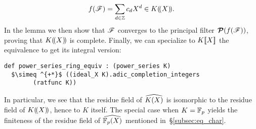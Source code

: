 \documentclass[sigplan,screen]{acmart}
\begin{document}
\[
f(\filter)=\sum_{d\in\ZZ} c_dX^d\in\laurentseries[K].
\]
In the lemma \href{https://github.com/mariainesdff/local_fields_journal/blob/0b408ff3af36e18f991f9d4cb87be3603cfc3fc3/src/laurent_series_equiv_adic_completion.lean#L630}{\extlink} we then show that $\filter$ converges to the principal filter $\princfilter(f(\filter))$, proving that $\laurentseries[K]$ is complete. Finally, we can specialize to $\powerseries[K]$ the equivalence 
to get its integral version:\href{https://github.com/mariainesdff/local_fields_journal/blob/0b408ff3af36e18f991f9d4cb87be3603cfc3fc3/src/laurent_series_equiv_adic_completion.lean#L983}{\extlink}
\begin{lstlisting}[caption={The isomorphism between power series and the unit ball in the completion of rational functions.}, label={code:iso_ps}]
def power_series_ring_equiv : (power_series K) 
  $\simeq ^{+*}$ ((ideal_X K).adic_completion_integers 
        (ratfunc K))
\end{lstlisting}
In particular, we see that the residue field of $\FpXCompl[K]$ is isomorphic to the residue field of $\laurentseries[K]$, hence to $K$ itself. The special case when $K=\FF$ yields the finiteness of the residue field of $\FpXCompl$ mentioned in~\S\ref{subsec:eq_char}.
\end{document}
